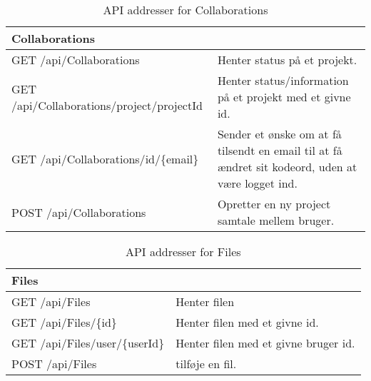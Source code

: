 \begin{table}[H]
	\centering
	\caption{API addresser for Collaborations}
	\label{tab:web_user}
	\begin{tabular}{p{5cm}|p{11cm}}
		\hline
		\multicolumn{2}{l}{\textbf{Collaborations}}\\
		\hline
		GET \newline
		/api/Collaborations &
		Henter status på et projekt. \\
		\hline
        GET \newline
		/api/Collaborations/project/{projectId} &
		Henter status/information på et projekt med et givne id. \\
		\hline
		GET \newline
		/api/Collaborations/{id}/\{email\} &
		Sender et ønske om at få tilsendt en email til at få ændret sit kodeord, uden at være logget ind.
		\\
		\hline
		POST \newline
		/api/Collaborations &
		Opretter en ny project samtale mellem bruger. \\
		\hline
	
	\end{tabular}
\end{table}

\begin{table}[H]
	\centering
	\caption{API addresser for Files}
	\label{tab:web_user}
	\begin{tabular}{p{5cm}|p{11cm}}
		\hline
		\multicolumn{2}{l}{\textbf{Files}}\\
		\hline
		GET \newline
		/api/Files &
		Henter filen  \\
        \hline
        GET \newline
		/api/Files/\{id\} &
		Henter filen med et givne id. \\
        \hline
        GET \newline
		/api/Files/user/\{userId\} &
		Henter filen med et givne bruger id. \\
		\hline
		POST \newline
		/api/Files &
		tilføje en fil. \\
		\hline
	
	\end{tabular}
\end{table}

